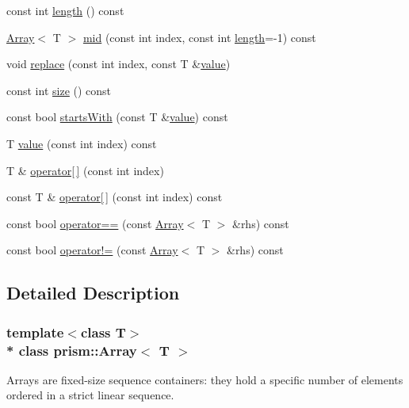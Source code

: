 \begin{DoxyCompactItemize}
\item 
const int \hyperlink{classprism_1_1_array_a7075e469a15ddfa81059842598fa9e89}{length} () const 
\item 
\hyperlink{classprism_1_1_array}{Array}$<$ T $>$ \hyperlink{classprism_1_1_array_a184d0853ea009fb9d156c1302d46a87d}{mid} (const int index, const int \hyperlink{classprism_1_1_array_a7075e469a15ddfa81059842598fa9e89}{length}=-\/1) const 
\item 
void \hyperlink{classprism_1_1_array_aa0aff831c9d2c94fd834d8abbbe94d2b}{replace} (const int index, const T \&\hyperlink{classprism_1_1_array_a2c5690996975510eed7112066b936d8f}{value})
\item 
const int \hyperlink{classprism_1_1_array_a83c88f0f351ac35798f40ed4e922e187}{size} () const 
\item 
const bool \hyperlink{classprism_1_1_array_aa80d5944d464d8de5f7b991b355e10b2}{starts\+With} (const T \&\hyperlink{classprism_1_1_array_a2c5690996975510eed7112066b936d8f}{value}) const 
\item 
T \hyperlink{classprism_1_1_array_a2c5690996975510eed7112066b936d8f}{value} (const int index) const 
\item 
T \& \hyperlink{classprism_1_1_array_aa8807977580f48dfd2cd7b6dd85dfebf}{operator\mbox{[}$\,$\mbox{]}} (const int index)
\item 
const T \& \hyperlink{classprism_1_1_array_a7a1278dfc1ae6ba4860787e3fd40c429}{operator\mbox{[}$\,$\mbox{]}} (const int index) const 
\item 
const bool \hyperlink{classprism_1_1_array_a17fded803080c4eed55773ad07ed8740}{operator==} (const \hyperlink{classprism_1_1_array}{Array}$<$ T $>$ \&rhs) const 
\item 
const bool \hyperlink{classprism_1_1_array_a8ec48eaa032005ff6141481ac18e6e9f}{operator!=} (const \hyperlink{classprism_1_1_array}{Array}$<$ T $>$ \&rhs) const 
\end{DoxyCompactItemize}


\subsection{Detailed Description}
\subsubsection*{template$<$class T$>$\\*
class prism\+::\+Array$<$ T $>$}

Arrays are fixed-\/size sequence containers\+: they hold a specific number of elements ordered in a strict linear sequence. 

